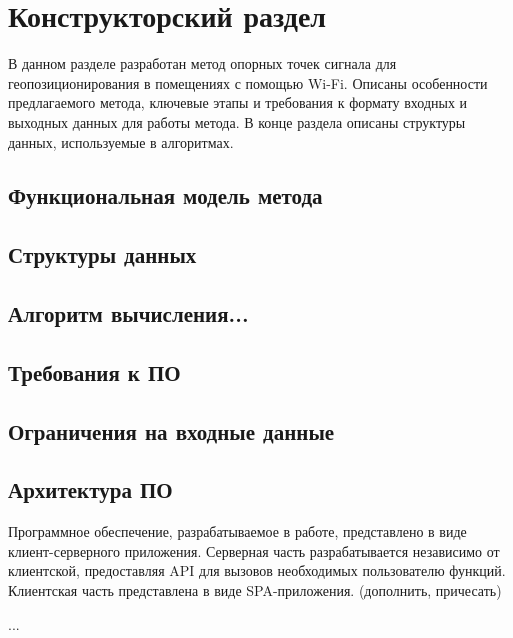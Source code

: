 \chapter{Конструкторский раздел}

В данном разделе разработан метод опорных точек сигнала для геопозиционирования в помещениях с помощью Wi-Fi. Описаны особенности предлагаемого метода, ключевые этапы и требования к формату входных и выходных данных для работы метода. В конце раздела описаны структуры данных, используемые в алгоритмах.

\section{Функциональная модель метода}

\section{Структуры данных}

\section{Алгоритм вычисления...}

\section{Требования к ПО}

\section{Ограничения на входные данные}

\section{Архитектура ПО}

Программное обеспечение, разрабатываемое в работе, представлено в виде клиент-серверного приложения. Серверная часть разрабатывается независимо от клиентской, предоставляя API для вызовов необходимых пользователю функций. Клиентская часть представлена в виде SPA-приложения. (дополнить, причесать)

...
